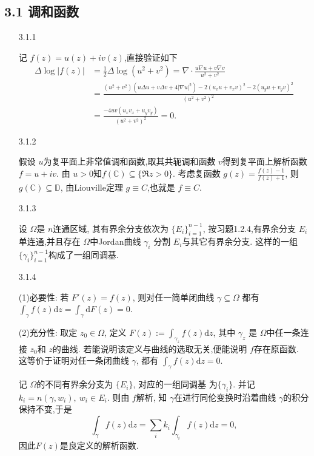 \subsection*{3.1 调和函数}
\begin{itemize}
    \item[3.1.1]

 记 $f(z) =u(z)+iv(z) $,直接验证如下
\begin{align*}
    \Delta \log|f(z)|& = \frac{1}{2}\Delta \log(u^2 + v^2) 
    = \nabla\cdot \frac{u\nabla u+v \nabla v}{u^2+v^2}\\
    & = \frac{(u^2+v^2)(u\Delta u+ v\Delta v+ 4|\nabla u|^2) 
    -2(u_x u + v_x v)^2-2(u_y u + v_y v)^2  }{(u^2+v^2)^2}\\
    &= \frac{-4uv(u_x v_x + u_y v_y) }{(u^2+v^2)^2} = 0.
\end{align*}

    \item[3.1.2]

 假设 $u$为复平面上非常值调和函数,取其共轭调和函数 $v$得到复平面上解析函数 $f = u + iv$. 
 由 $u>0$知$f(\mathbb{C})\subseteq \{\Re z>0\}$.
 考虑复函数 $g(z) =   \frac{f(z)-1}{f(z)+1}$, 
 则 $g(\mathbb{C})\subseteq \mathbb{D}$, 
 由Liouville定理 $g \equiv  C$,也就是 $f\equiv C.$


    \item[3.1.3]

  设 $\Omega$是 $n$连通区域, 其有界余分支依次为 $\{E_i\}_{i=1}^{n-1}$, 
  按习题1.2.4,有界余分支 $E_i$单连通,并且存在 $\Omega$中Jordan曲线 $\gamma_i$
  分割 $E_i$与其它有界余分支. 这样的一组 $\{\gamma_i\}_{i=1}^{n-1}$构成了一组同调基.


    \item[3.1.4]

 (1)必要性: 若 $F'(z) = f(z)$, 则对任一简单闭曲线 $\gamma \subseteq \Omega$
 都有 $\int_\gamma f(z)\mathrm{d}z = \int_\gamma \mathrm{d}F(z) = 0.$

 (2)充分性: 取定 $z_0 \in \Omega$, 定义 $F(z) := \int_{\gamma_z}f(z)\mathrm{d}z $,
 其中 $\gamma_z$ 是 $\Omega$中任一条连接 $z_0$和 $z$的曲线. 
 若能说明该定义与曲线的选取无关,便能说明 $f$存在原函数. 
 这等价于证明对任一条闭曲线  $\gamma$, 都有 $\int_\gamma f(z)\mathrm{d}z = 0$. 

 记 $\Omega$的不同有界余分支为 $\{E_i\}$,  对应的一组同调基 为$\{\gamma_i\}$. 
 并记 $k_i = n(\gamma,w_i),\ w_i \in E_i$. 
 则由 $f$解析, 知 $\gamma$在进行同伦变换时沿着曲线  $\gamma$的积分保持不变,于是
 $$\int_\gamma f(z)\mathrm{d}z = \sum_i k_i \int_{\gamma_i}f(z)\mathrm{d}z = 0,$$
 因此$F(z)$是良定义的解析函数.



\end{itemize}
